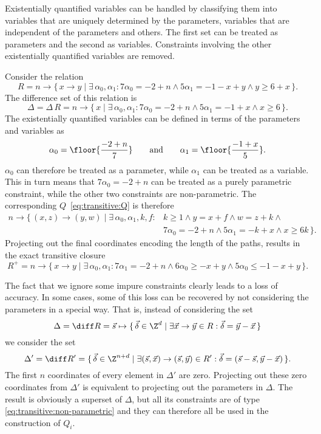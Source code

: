 Existentially quantified variables can be handled by
classifying them into variables that are uniquely
determined by the parameters, variables that are independent
of the parameters and others.  The first set can be treated
as parameters and the second as variables.  Constraints involving
the other existentially quantified variables are removed.

\begin{example}
Consider the relation
$$
R =
n \to \{\, x \to y \mid \exists \, \alpha_0, \alpha_1: 7\alpha_0 = -2 + n \wedge 5\alpha_1 = -1 - x + y \wedge y \ge 6 + x \,\}
.
$$
The difference set of this relation is
$$
\Delta = \Delta \, R =
n \to \{\, x \mid \exists \, \alpha_0, \alpha_1: 7\alpha_0 = -2 + n \wedge 5\alpha_1 = -1 + x \wedge x \ge 6 \,\}
.
$$
The existentially quantified variables can be defined in terms
of the parameters and variables as
$$
\alpha_0 = \floor{\frac{-2 + n}7}
\qquad
\text{and}
\qquad
\alpha_1 = \floor{\frac{-1 + x}5}
.
$$
$\alpha_0$ can therefore be treated as a parameter,
while $\alpha_1$ can be treated as a variable.
This in turn means that $7\alpha_0 = -2 + n$ can be treated as
a purely parametric constraint, while the other two constraints are
non-parametric.
The corresponding $Q$~\eqref{eq:transitive:Q} is therefore
$$
\begin{aligned}
n \to \{\, (x,z) \to (y,w) \mid
\exists\, \alpha_0, \alpha_1, k, f : {} &
k \ge 1 \wedge
y = x + f \wedge
w = z + k \wedge {} \\
&
7\alpha_0 = -2 + n \wedge
5\alpha_1 = -k + x \wedge
x \ge 6 k
\,\}
.
\end{aligned}
$$
Projecting out the final coordinates encoding the length of the paths,
results in the exact transitive closure
$$
R^+ =
n \to \{\, x \to y \mid \exists \, \alpha_0, \alpha_1: 7\alpha_1 = -2 + n \wedge 6\alpha_0 \ge -x + y \wedge 5\alpha_0 \le -1 - x + y \,\}
.
$$
\end{example}

The fact that we ignore some impure constraints clearly leads
to a loss of accuracy.  In some cases, some of this loss can be recovered
by not considering the parameters in a special way.
That is, instead of considering the set
$$
\Delta = \diff R =
\vec s \mapsto
\{\, \vec \delta \in \Z^{d} \mid \exists \vec x \to \vec y \in R :
\vec \delta = \vec y - \vec x
\,\}
$$
we consider the set
$$
\Delta' = \diff R' =
\{\, \vec \delta \in \Z^{n+d} \mid \exists
(\vec s, \vec x) \to (\vec s, \vec y) \in R' :
\vec \delta = (\vec s - \vec s, \vec y - \vec x)
\,\}
.
$$
The first $n$ coordinates of every element in $\Delta'$ are zero.
Projecting out these zero coordinates from $\Delta'$ is equivalent
to projecting out the parameters in $\Delta$.
The result is obviously a superset of $\Delta$, but all its constraints
are of type \eqref{eq:transitive:non-parametric} and they can therefore
all be used in the construction of $Q_i$.

